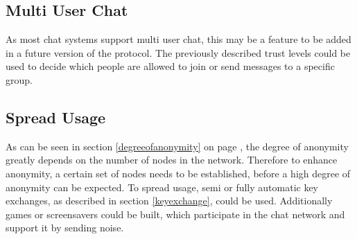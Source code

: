 \subsection{Multi User Chat}
As most chat systems support multi user chat, this may be a feature to be added
in a future version of the protocol. The previously described trust levels
could be used to decide which people are allowed to join or send messages
to a specific group.
\subsection{Spread Usage}
As can be seen in section \ref{degreeofanonymity} on page \pageref{degreeofanonymity},
the degree of anonymity greatly depends on the number of nodes in the network.
Therefore to enhance anonymity, a certain set of nodes needs to be established,
before a high degree of anonymity can be expected.
To spread usage, semi or fully automatic key exchanges, as described
in section \ref{keyexchange}, could be used. Additionally 
games or screensavers could be built, which participate in the
chat network and support it by sending noise.
